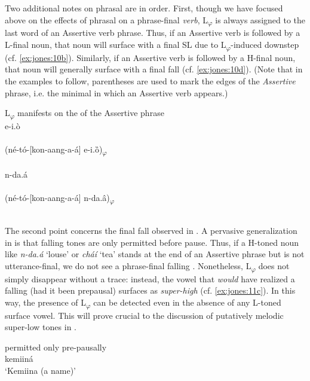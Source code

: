 \documentclass[output=paper,newtxmath,modfonts,nonflat,draft]{langsci/langscibook}
\begin{document}
Two additional notes on phrasal  are in order. First, though we have focused above on the effects of phrasal  on a phrase-final \textit{verb}, L\textsubscript{$\varphi $} is always assigned to the last word of an Assertive verb phrase. Thus, if an Assertive verb is followed by a L-final noun, that noun will surface with a final SL  due to L\textsubscript{$\varphi $}-induced downstep (cf. \ref{ex:jones:10b}). Similarly, if an Assertive verb is followed by a H-final noun, that noun will generally surface with a final fall (cf. \ref{ex:jones:10d}). (Note that in the examples to follow, parentheses are used to mark the edges of the \textit{Assertive} phrase, i.e. the minimal  in which an Assertive verb appears.)

\largerpage
\ea\label{ex:jones:10}
{L\textsubscript{$\varphi $} manifests on the  of the Assertive phrase}\\
\ea\label{ex:jones:10a}
{e-i.ò} \\
\\
\ex\label{ex:jones:10b}
{(né-tó-[kon-aang-a-á] e-i.ȍ)\textsubscript{$\varphi $}} \\
\\
\ex\label{ex:jones:10c}
{n-da.á} \\
\\
\ex\label{ex:jones:10d}
{(né-tó-[kon-aang-a-á] n-da.â)\textsubscript{$\varphi $}} \\
\\
\z
\z

The second point concerns the final fall observed in . A pervasive generalization in  is that falling tones are only permitted before pause. Thus, if a H-toned noun like \textit{n-da.á} ‘louse’ or \textit{cháí} ‘tea’ stands at the end of an Assertive phrase but is not utterance-final, we do not see a phrase-final falling . Nonetheless, L\textsubscript{$\varphi $} does not simply disappear without a trace: instead, the vowel that \textit{would} have realized a falling  (had it been prepausal) surfaces as \textit{super-high} (cf. \ref{ex:jones:11c}). In this way, the presence of L\textsubscript{$\varphi $} can be detected even in the absence of any L-toned surface vowel. This will prove crucial to the discussion of putatively melodic super-low tones in .

\ea\label{ex:jones:11}
 permitted only pre-pausally \citep[252]{Roberts-Kohno2000}\\
\ea\label{ex:jones:11a}
{kemiiná} \\
\glt   ‘Kemiina (a name)’
\end{document}
